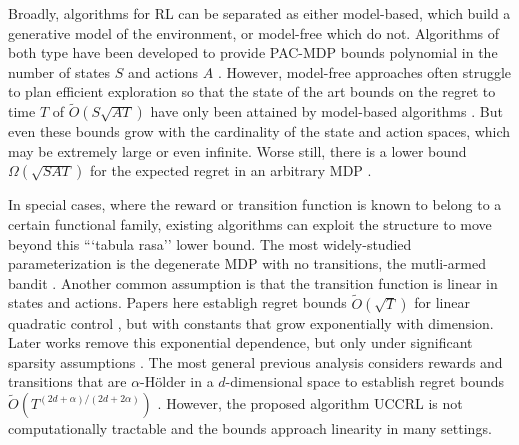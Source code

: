 \documentclass{article}
\begin{document}

Broadly, algorithms for RL can be separated as either model-based, which build a generative model of the environment, or model-free which do not.
Algorithms of both type have been developed to provide PAC-MDP bounds polynomial in the number of states $S$ and actions $A$ \cite{kearns2002near,brafman2003r,strehl2006pac}.
However, model-free approaches often struggle to plan efficient exploration so that the state of the art bounds on the regret to time $T$ of $\tilde{O}(S\sqrt{AT})$ have only been attained by model-based algorithms \cite{jaksch2010near,osband2013more}.
But even these bounds grow with the cardinality of the state and action spaces, which may be extremely large or even infinite.
Worse still, there is a lower bound $\Omega ( \sqrt{SAT} )$ for the expected regret in an arbitrary MDP \cite{jaksch2010near}.

In special cases, where the reward or transition function is known to belong to a certain functional family, existing algorithms can exploit the structure to move beyond this ```tabula rasa'' lower bound.
The most widely-studied parameterization is the degenerate MDP with no transitions, the mutli-armed bandit \cite{auer2003using,bubeck2011xarmed,russo2013}.
Another common assumption is that the transition function is linear in states and actions.
Papers here establigh regret bounds $\tilde{O}(\sqrt{T})$ for linear quadratic control \cite{abbasi2011improved}, but with constants that grow exponentially with dimension.
Later works remove this exponential dependence, but only under significant sparsity assumptions \cite{ibrahimi2012efficient}.
The most general previous analysis considers rewards and transitions that are $\alpha$-H\"{o}lder in a $d$-dimensional space to establish regret bounds $\tilde{O}(T^{(2d+\alpha)/(2d+2\alpha)})$ \cite{ortner2012online}.
However, the proposed algorithm UCCRL is not computationally tractable and the bounds approach linearity in many settings.
\end{document}
